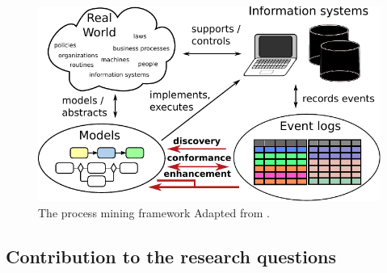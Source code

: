 \begin{figure}
	\centering
	\includegraphics[width=0.55\linewidth]{figures/process-mining-big-picture}
	\caption{The process mining framework Adapted from \citep{VanderAalst2016b}.}
	\label{fig:process-mining}
\end{figure}




\subsection{Contribution to the research questions} 

